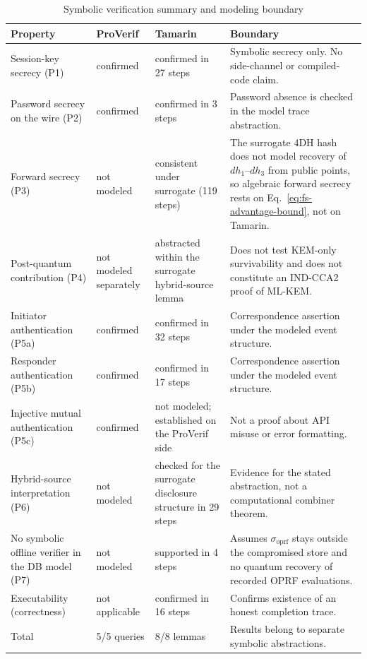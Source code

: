 \documentclass[preprint,12pt]{elsarticle}
\newcommand{\sigoprf}{\sigma_{\mathrm{oprf}}}
\theoremstyle{remark}
\begin{document}
\begin{table}[htbp]
\caption{Symbolic verification summary and modeling boundary}
\label{tab:verification-summary}
\centering\scriptsize
\begin{tabularx}{\textwidth}{@{}L{3.4cm}L{2.4cm}L{3.3cm}X@{}}
\toprule
Property & ProVerif & Tamarin & Boundary \\
\midrule
Session-key secrecy (P1) & confirmed & confirmed in 27 steps & Symbolic secrecy only. No side-channel or compiled-code claim. \\
Password secrecy on the wire (P2) & confirmed & confirmed in 3 steps & Password absence is checked in the model trace abstraction. \\
Forward secrecy (P3) & not modeled & consistent under surrogate (119 steps) & The surrogate 4DH hash does not model recovery of $dh_1$--$dh_3$ from public points, so algebraic forward secrecy rests on Eq.~\eqref{eq:fs-advantage-bound}, not on Tamarin. \\
Post-quantum contribution (P4) & not modeled separately & abstracted within the surrogate hybrid-source lemma & Does not test KEM-only survivability and does not constitute an IND-CCA2 proof of ML-KEM. \\
Initiator authentication (P5a) & confirmed & confirmed in 32 steps & Correspondence assertion under the modeled event structure. \\
Responder authentication (P5b) & confirmed & confirmed in 17 steps & Correspondence assertion under the modeled event structure. \\
Injective mutual authentication (P5c) & confirmed & not modeled; established on the ProVerif side & Not a proof about API misuse or error formatting. \\
Hybrid-source interpretation (P6) & not modeled & checked for the surrogate disclosure structure in 29 steps & Evidence for the stated abstraction, not a computational combiner theorem. \\
No symbolic offline verifier in the DB model (P7) & not modeled & supported in 4 steps & Assumes $\sigoprf$ stays outside the compromised store and no quantum recovery of recorded OPRF evaluations. \\
Executability (correctness) & not applicable & confirmed in 16 steps & Confirms existence of an honest completion trace. \\
\midrule
Total & 5/5 queries & 8/8 lemmas & Results belong to separate symbolic abstractions. \\
\bottomrule
\end{tabularx}
\end{table}
\end{document}
